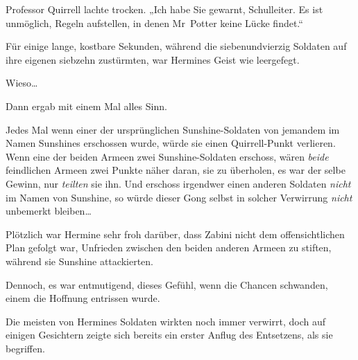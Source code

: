 Professor Quirrell lachte trocken. „Ich habe Sie gewarnt, Schulleiter. Es ist unmöglich, Regeln aufstellen, in denen Mr~Potter keine Lücke findet.“

\later

Für einige lange, kostbare Sekunden, während die siebenundvierzig Soldaten auf ihre eigenen siebzehn zustürmten, war Hermines Geist wie leergefegt.

Wieso…

Dann ergab mit einem Mal alles Sinn.

Jedes Mal wenn einer der ursprünglichen Sunshine-Soldaten von jemandem im Namen Sunshines erschossen wurde, würde sie einen Quirrell-Punkt verlieren. Wenn eine der beiden Armeen zwei Sunshine-Soldaten erschoss, wären \emph{beide} feindlichen Armeen zwei Punkte näher daran, sie zu überholen, es war der selbe Gewinn, nur \emph{teilten} sie ihn. Und erschoss irgendwer einen anderen Soldaten \emph{nicht} im Namen von Sunshine, so würde dieser Gong selbst in solcher Verwirrung \emph{nicht} unbemerkt bleiben…

Plötzlich war Hermine sehr froh darüber, dass Zabini nicht dem offensichtlichen Plan gefolgt war, Unfrieden zwischen den beiden anderen Armeen zu stiften, während sie Sunshine attackierten.

Dennoch, es war entmutigend, dieses Gefühl, wenn die Chancen schwanden, einem die Hoffnung entrissen wurde.

Die meisten von Hermines Soldaten wirkten noch immer verwirrt, doch auf einigen Gesichtern zeigte sich bereits ein erster Anflug des Entsetzens, als sie begriffen.

